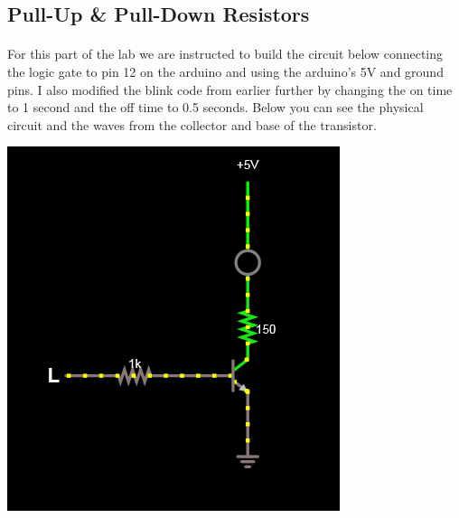 \documentclass[12pt]{article}
\begin{document}
		\subsection{Pull-Up \& Pull-Down Resistors}
			\paragraph{}
				For this part of the lab we are instructed to build the circuit below connecting the logic gate to pin 12 on the arduino and using the arduino's 5V and 
				ground pins.  I also modified the blink code from earlier further by changing the on time to 1 second and the off time to 0.5 seconds.  Below you can 
				see the physical circuit and the waves from the collector and base of the transistor.

				\begin{center}
					\includegraphics[scale=0.4]{pull-up.png}\\
					\vspace{1cm}

\end{center}
\end{document}
